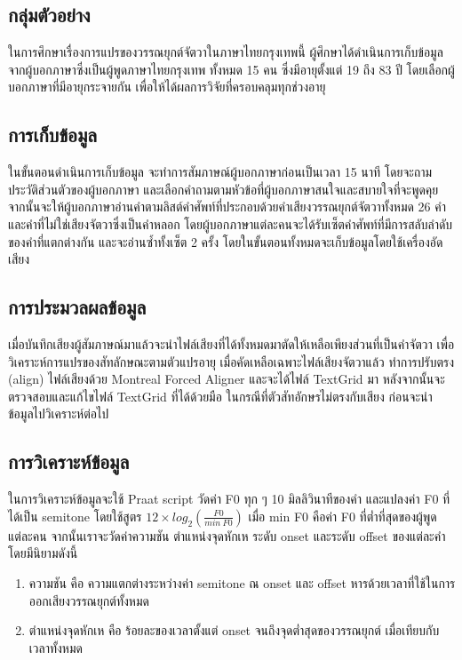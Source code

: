 \documentclass[a4paper]{article}
\begin{document}
\subsection{กลุ่มตัวอย่าง}
    ในการศึกษาเรื่องการแปรของวรรณยุกต์จัตวาในภาษาไทยกรุงเทพนี้ ผู้ศึกษาได้ดำเนินการเก็บข้อมูลจากผู้บอกภาษาซึ่งเป็นผู้พูดภาษาไทยกรุงเทพ ทั้งหมด 15 คน ซึ่งมีอายุตั้งแต่ 19 ถึง 83 ปี โดยเลือกผู้บอกภาษาที่มีอายุกระจายกัน เพื่อให้ได้ผลการวิจัยที่ครอบคลุมทุกช่วงอายุ
\subsection{การเก็บข้อมูล}
    ในขั้นตอนดำเนินการเก็บข้อมูล จะทำการสัมภาษณ์ผู้บอกภาษาก่อนเป็นเวลา 15 นาที โดยจะถามประวัติส่วนตัวของผู้บอกภาษา และเลือกคำถามตามหัวข้อที่ผู้บอกภาษาสนใจและสบายใจที่จะพูดคุย จากนั้นจะให้ผู้บอกภาษาอ่านคำตามลิสต์คำศัพท์ที่ประกอบด้วยคำเสียงวรรณยุกต์จัตวาทั้งหมด 26 คำ และคำที่ไม่ใช่เสียงจัตวาซึ่งเป็นคำหลอก โดยผู้บอกภาษาแต่ละคนจะได้รับเซ็ตคำศัพท์ที่มีการสลับลำดับของคำที่แตกต่างกัน และจะอ่านซ้ำทั้งเซ็ต 2 ครั้ง โดยในขั้นตอนทั้งหมดจะเก็บข้อมูลโดยใช้เครื่องอัดเสียง
\subsection{การประมวลผลข้อมูล}
    เมื่อบันทึกเสียงผู้สัมภาษณ์มาแล้วจะนำไฟล์เสียงที่ได้ทั้งหมดมาตัดให้เหลือเพียงส่วนที่เป็นคำจัตวา เพื่อวิเคราะห์การแปรของสัทลักษณะตามตัวแปรอายุ เมื่อคัดเหลือเฉพาะไฟล์เสียงจัตวาแล้ว ทำการปรับตรง (align) ไฟล์เสียงด้วย Montreal Forced Aligner และจะได้ไฟล์ TextGrid มา หลังจากนั้นจะตรวจสอบและแก้ไขไฟล์ TextGrid ที่ได้ด้วยมือ ในกรณีที่ตัวสัทอักษรไม่ตรงกับเสียง ก่อนจะนำข้อมูลไปวิเคราะห์ต่อไป
\subsection{การวิเคราะห์ข้อมูล}
    ในการวิเคราะห์ข้อมูลจะใช้ Praat script วัดค่า F0 ทุก ๆ 10 มิลลิวินาทีของคำ และแปลงค่า F0 ที่ได้เป็น semitone  โดยใช้สูตร $12 \times log_2(\frac{F0}{min\ F0})$ เมื่อ min F0 คือค่า F0 ที่ต่ำที่สุดของผู้พูดแต่ละคน จากนั้นเราจะวัดค่าความชัน ตำแหน่งจุดหักเห ระดับ onset และระดับ offset ของแต่ละคำ โดยมีนิยามดังนี้
    \begin{enumerate}
        \item ความชัน คือ ความแตกต่างระหว่างค่า semitone ณ onset และ offset หารด้วยเวลาที่ใช้ในการออกเสียงวรรณยุกต์ทั้งหมด
        \item ตำแหน่งจุดหักเห คือ ร้อยละของเวลาตั้งแต่ onset จนถึงจุดต่ำสุดของวรรณยุกต์ เมื่อเทียบกับเวลาทั้งหมด
    \end{enumerate}
\end{document}
